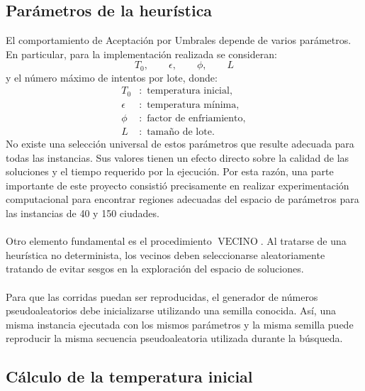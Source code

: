 \documentclass[12pt]{article}
\begin{document}
\subsection{Parámetros de la heurística}
\label{subsec:parametros-heuristica}

El comportamiento de Aceptación por Umbrales depende de varios parámetros.
En particular, para la implementación realizada se consideran:
\[
    T_0,\qquad
    \epsilon,\qquad
    \phi,\qquad
    L
\]
y el número máximo de intentos por lote, donde:
\[
\begin{aligned}
    T_0      &:\text{ temperatura inicial},\\
    \epsilon &:\text{ temperatura mínima},\\
    \phi     &:\text{ factor de enfriamiento},\\
    L        &:\text{ tamaño de lote}.
\end{aligned}
\]
No existe una selección universal de estos parámetros que resulte adecuada
para todas las instancias. Sus valores tienen un efecto directo sobre la
calidad de las soluciones y el tiempo requerido por la ejecución. Por esta
razón, una parte importante de este proyecto consistió precisamente en
realizar experimentación computacional para encontrar regiones adecuadas del
espacio de parámetros para las instancias de 40 y 150 ciudades.
\\\\
Otro elemento fundamental es el procedimiento
\(\operatorname{VECINO}\). Al tratarse de una heurística no determinista,
los vecinos deben seleccionarse aleatoriamente tratando de evitar sesgos en
la exploración del espacio de soluciones.
\\\\
Para que las corridas puedan ser reproducidas, el generador de números
pseudoaleatorios debe inicializarse utilizando una semilla conocida. Así,
una misma instancia ejecutada con los mismos parámetros y la misma semilla
puede reproducir la misma secuencia pseudoaleatoria utilizada durante la
búsqueda.

\subsection{Cálculo de la temperatura inicial}
\label{subsec:temperatura-inicial}
\end{document}
